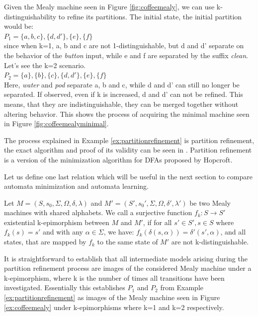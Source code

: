 \begin{example}
	Given the Mealy machine seen in Figure \ref{fig:coffeemealy}, we can use k-distinguishability to refine its partitions. The initial state, the initial partition would be:\\
	$P_1 = \{a, b, c\}, \{d, d'\}, \{e\}, \{f\}$\\
	since when k=1, a, b and c are not 1-distinguishable, but d and d' separate on the behavior of the \textit{button} input, while e and f are separated by the suffix \textit{clean}. Let's see the k=2 scenario.\\
	$P_2 = \{a\}, \{b\}, \{c\}, \{d, d'\}, \{e\}, \{f\}$\\
	Here, \textit{water} and \textit{pod} separate a, b and c, while d and d' can still no longer be separated. If observed, even if k is increased, d and d' can not be refined. This means, that they are indistinguishable, they can be merged together without altering behavior. This shows the process of acquiring the minimal machine seen in Figure \ref{fig:coffeemealyminimal}.
	\label{ex:partitionrefinement}
\end{example} 

The process explained in Example \ref{ex:partitionrefinement} is partition refinement, the exact algorithm and proof of its validity can be seen in \cite{Steffen2011}. Partition refinement is a version of the minimization algorithm for DFAs proposed by Hopcroft\cite{HOPCROFT1971189}. 

Let us define one last relation which will be useful in the next section to compare automata minimization and automata learning.

\begin{definition}[k-epimorphisms]
	Let $M=(S,s_{0},\Sigma,\Omega,\delta,\lambda)$ and $M'=(S',s_{0}',\Sigma,\Omega,\delta',\lambda')$ be two Mealy machines with shared alphabets. We call a surjective function $f_k: S \to S'$ existential k-epimorphism between $M$ and $M'$, if for all $s'\in S', s\in S$ where $f_k(s) = s'$ and with any $\alpha\in\Sigma$, we have: $f_k(\delta(s,\alpha)) = \delta'(s',\alpha)$, and all states, that are mapped by $f_k$ to the same state of $M'$ are not k-distinguishable.
\end{definition}

It is straightforward to establish that all intermediate models arising during the partition refinement process are images of the considered Mealy machine under a k-epimorphism, where k is the number of times all transitions have been investigated.\cite{Steffen2011} Essentially this establishes $P_1$ and $P_2$ from Example \ref*{ex:partitionrefinement} as images of the Mealy machine seen in Figure \ref{ex:coffeemealy} under k-epimorphisms where k=1 and k=2 respectively. 

